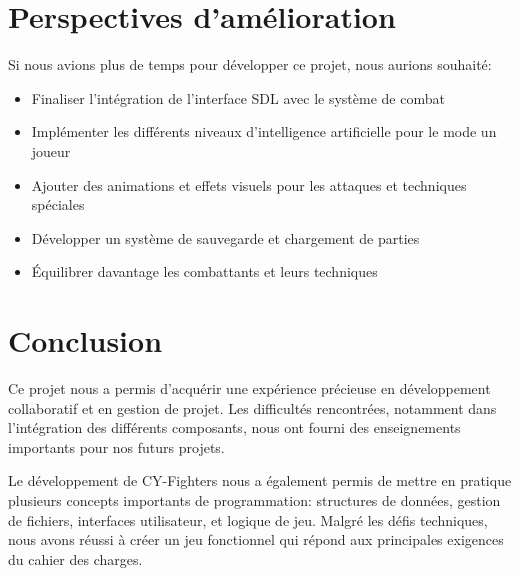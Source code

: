 \documentclass[12pt,a4paper]{article}
\begin{document}
\section{Perspectives d'amélioration}
Si nous avions plus de temps pour développer ce projet, nous aurions souhaité:
\begin{itemize}
    \item Finaliser l'intégration de l'interface SDL avec le système de combat
    \item Implémenter les différents niveaux d'intelligence artificielle pour le mode un joueur
    \item Ajouter des animations et effets visuels pour les attaques et techniques spéciales
    \item Développer un système de sauvegarde et chargement de parties
    \item Équilibrer davantage les combattants et leurs techniques
\end{itemize}

\section{Conclusion}
Ce projet nous a permis d'acquérir une expérience précieuse en développement collaboratif et en gestion de projet. Les difficultés rencontrées, notamment dans l'intégration des différents composants, nous ont fourni des enseignements importants pour nos futurs projets.

Le développement de CY-Fighters nous a également permis de mettre en pratique plusieurs concepts importants de programmation: structures de données, gestion de fichiers, interfaces utilisateur, et logique de jeu. Malgré les défis techniques, nous avons réussi à créer un jeu fonctionnel qui répond aux principales exigences du cahier des charges.
\end{document}
